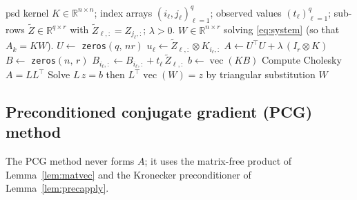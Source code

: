 \documentclass[12pt]{article}
\DeclareMathOperator{\vecop}{vec}
\newcommand{\bR}{\mathbb{R}}
\theoremstyle{remark}
\begin{document}
\begin{algorithm}[H]
\caption{Direct symmetric solver for the mode-$k$ subproblem \eqref{eq:system}}
\label{alg:direct}
\begin{algorithmic}[1]
  \Require psd kernel $K\in\bR^{n\times n}$; index arrays $(i_\ell,j_\ell)_{\ell=1}^q$; observed values $(t_\ell)_{\ell=1}^q$; sub-rows $\tilde Z\in\bR^{q\times r}$ with $\tilde Z_{\ell,:}=Z_{j_\ell,:}$; $\lambda>0$.
  \Ensure $W\in\bR^{n\times r}$ solving \eqref{eq:system} (so that $A_k=KW$).
  \State $U \gets$ \texttt{zeros}$(q,\,nr)$
    \State $u_\ell \gets \tilde Z_{\ell,:}\otimes K_{i_\ell,:}$ 
  \EndFor
  \State $A \gets U^{\!\top}U + \lambda\,(I_r\otimes K)$ 
  \State $B \gets$ \texttt{zeros}$(n,\,r)$
    \State $B_{i_\ell,:} \gets B_{i_\ell,:} + t_\ell\,\tilde Z_{\ell,:}$ 
  \EndFor
  \State $b \gets \vecop(KB)$
  \State Compute Cholesky $A = L L^{\!\top}$ 
  \State Solve $L\,z = b$ then $L^{\!\top}\vecop(W) = z$ by triangular substitution
  \State \Return $W$
\end{algorithmic}
\end{algorithm}

\subsection{Preconditioned conjugate gradient (PCG) method}

The PCG method never forms $A$; it uses the matrix-free product of Lemma~\ref{lem:matvec} and the Kronecker preconditioner of Lemma~\ref{lem:precapply}.
\end{document}
